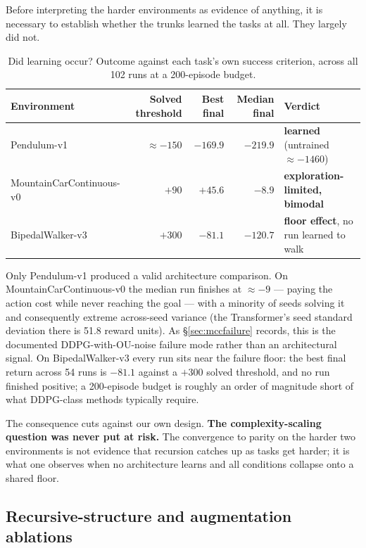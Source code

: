 \documentclass[11pt]{article}
\begin{document}
Before interpreting the harder environments as evidence of anything, it is necessary to establish whether the trunks learned the tasks at all. They largely did not.

\begin{table}[h]
\centering
\small
\begin{tabular}{lrrrl}
\toprule
Environment & Solved threshold & Best final & Median final & Verdict \\
\midrule
Pendulum-v1 & ${\approx}-150$ & $-169.9$ & $-219.9$ & \textbf{learned} (untrained ${\approx}-1460$) \\
MountainCarContinuous-v0 & $+90$ & $+45.6$ & $-8.9$ & \textbf{exploration-limited, bimodal} \\
BipedalWalker-v3 & $+300$ & $-81.1$ & $-120.7$ & \textbf{floor effect}, no run learned to walk \\
\bottomrule
\end{tabular}
\caption{Did learning occur? Outcome against each task's own success criterion, across all 102 runs at a 200-episode budget.}
\label{tab:validity}
\end{table}

Only Pendulum-v1 produced a valid architecture comparison. On MountainCarContinuous-v0 the median run finishes at ${\approx}-9$ --- paying the action cost while never reaching the goal --- with a minority of seeds solving it and consequently extreme across-seed variance (the Transformer's seed standard deviation there is 51.8 reward units). As \S\ref{sec:mccfailure} records, this is the documented DDPG-with-OU-noise failure mode rather than an architectural signal. On BipedalWalker-v3 every run sits near the failure floor: the best final return across 54 runs is $-81.1$ against a $+300$ solved threshold, and no run finished positive; a 200-episode budget is roughly an order of magnitude short of what DDPG-class methods typically require.

The consequence cuts against our own design. \textbf{The complexity-scaling question was never put at risk.} The convergence to parity on the harder two environments is not evidence that recursion catches up as tasks get harder; it is what one observes when no architecture learns and all conditions collapse onto a shared floor.

\subsection{Recursive-structure and augmentation ablations}
\end{document}
